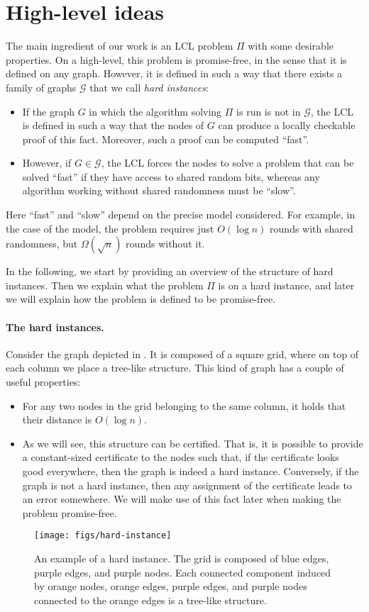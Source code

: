 \documentclass[11pt]{article}
\begin{document}
\section{High-level ideas}
The main ingredient of our work is an LCL problem $\Pi$ with some desirable properties. On a high-level, this problem is promise-free, in the sense that it is defined on any graph. However, it is defined in such a way that there exists a family of graphs $\mathcal{G}$ that we call \emph{hard instances}:
\begin{itemize}
	\item If the graph $G$ in which the algorithm solving $\Pi$ is run is not in $\mathcal{G}$, the LCL is defined in such a way that the nodes of $G$ can produce a locally checkable proof of this fact. Moreover, such a proof can be computed ``fast''.
	\item However, if $G \in \mathcal{G}$, the LCL forces the nodes to solve a
	problem that can be solved ``fast'' if they have access to shared random bits,
	whereas any algorithm working without shared randomness must be ``slow''.
\end{itemize}
Here ``fast'' and ``slow'' depend on the precise model considered. 
For example, in the case of the \local model, the problem requires just $O(\log n)$ rounds with shared randomness, but $\Omega(\sqrt{n})$ rounds without it.

In the following, we start by providing an overview of the structure of hard
instances. Then we explain what the problem $\Pi$ is on a hard instance, and
later we will explain how the problem is defined to be promise-free.

\paragraph{The hard instances.}
Consider the graph depicted in . It is composed of a
square grid, where on top of each column we place a tree-like structure.
This kind of graph has a couple of useful properties:
\begin{itemize}
	\item For any two nodes in the grid belonging to the same column, it holds that their distance is $O(\log n)$.
	\item As we will see, this structure can be certified. That is, it is possible
	to provide a constant-sized certificate to the nodes such that, if the
	certificate looks good everywhere, then the graph is indeed a hard instance.
	Conversely, if the graph is not a hard instance, then any assignment of the
	certificate leads to an error somewhere. We will make use of this fact later
	when making the problem promise-free.
\end{itemize}
\begin{figure}
	\centering
	\texttt{[image: figs/hard-instance]}
	\caption{An example of a hard instance. The grid is composed of blue edges, purple edges, and purple nodes. Each connected component induced by orange nodes, orange edges, purple edges, and purple nodes connected to the orange edges is a tree-like structure.}\label{fig:hard-instance}
\end{figure}
\end{document}
